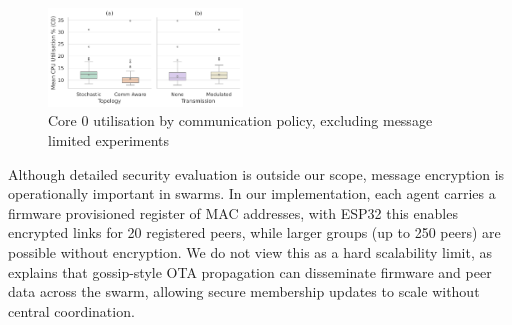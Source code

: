 \documentclass[conference]{IEEEtran}
\begin{document}
\begin{figure}[H]
    \centering
    \includegraphics[width=0.46\textwidth]{cpu_util.pdf}
    \caption{Core 0 utilisation by communication policy, excluding message limited experiments}
    \label{fig:cpu_util}
\end{figure}



Although detailed security evaluation is outside our scope, message encryption is operationally important in swarms. In our implementation, each agent carries a firmware provisioned register of MAC addresses, with ESP32 this enables encrypted links for 20 registered peers, while larger groups (up to 250 peers) are possible without encryption. We do not view this as a hard scalability limit, as \cite{varadharajan_over--air_2018} explains that gossip-style OTA propagation can disseminate firmware and peer data across the swarm, allowing secure membership updates to scale without central coordination.
\end{document}
